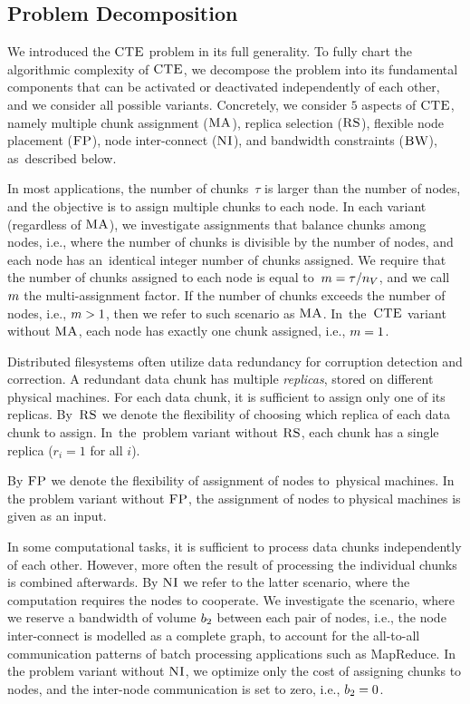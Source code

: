 \subsection{Problem Decomposition}

We introduced the $\textsc{CTE}$ problem in its full generality.
To fully chart the algorithmic complexity of $\textsc{CTE}$, we decompose the problem into its fundamental components that can be activated or deactivated independently of each other, and we consider all possible variants.
Concretely, we consider $5$ aspects of $\textsc{CTE}$, namely multiple chunk assignment ($\textsc{MA}$),
replica selection ($\textsc{RS}$), flexible node placement ($\textsc{FP}$), node inter-connect ($\textsc{NI}$),
and bandwidth constraints ($\textsc{BW}$), as~described below.

In most applications, the number of chunks~$\tau$ is larger than the number of nodes, and the objective is to assign multiple chunks to each node.
In each variant (regardless of $\textsc{MA}$), we investigate assignments that balance chunks among nodes, i.e., where the number of chunks is divisible by the number of nodes, and each node has an~identical integer number of chunks assigned.
We require that the number of chunks assigned to each node is equal to~$m = \tau / n_V$, and we call $m$ the multi-assignment factor.
If the number of chunks exceeds the number of nodes, i.e., $m > 1$, then we refer to such scenario as $\textsc{MA}$.
In~the~$\textsc{CTE}$ variant without $\textsc{MA}$, each node has exactly one chunk assigned, i.e., $m = 1$.

Distributed filesystems often utilize data redundancy for corruption detection and correction.
A redundant data chunk has multiple \emph{replicas}, stored on different physical machines.
For each data chunk, it is sufficient to assign only one of its replicas.
By~$\textsc{RS}$ we denote the flexibility of choosing which replica of each data chunk to assign.
In~the~problem variant without $\textsc{RS}$, each chunk has a single replica ($r_i = 1$ for all $i$).

By $\textsc{FP}$ we denote the flexibility of assignment of nodes to~physical machines.
In the problem variant without $\textsc{FP}$, the assignment of nodes to physical machines is given as an input.

In some computational tasks, it is sufficient to process data chunks independently of each other.
However, more often the result of processing the individual chunks is combined afterwards.
By $\textsc{NI}$ we refer to the latter scenario, where the computation requires the nodes to cooperate.
We investigate the scenario, where we reserve a bandwidth of volume $b_2$ between each pair of nodes, i.e., the node inter-connect is modelled as a complete graph, to account for the all-to-all communication patterns of batch processing applications such as MapReduce.
In the problem variant without $\textsc{NI}$, we optimize only the cost of assigning chunks to nodes, and the inter-node communication is set to zero, i.e., $b_2 = 0$.

